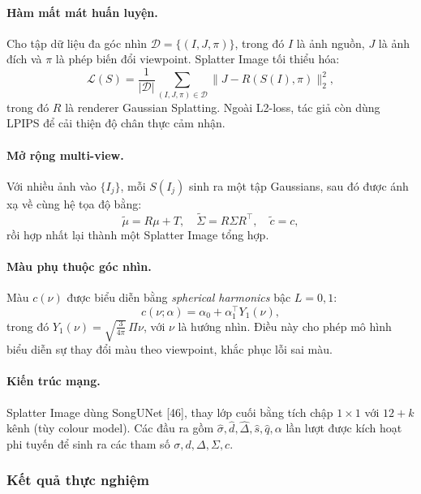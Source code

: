                 \paragraph{Hàm mất mát huấn luyện.}  
                Cho tập dữ liệu đa góc nhìn $\mathcal{D} = \{(I, J, \pi)\}$, trong đó $I$ là ảnh nguồn, $J$ là ảnh đích và $\pi$ là phép biến đổi viewpoint. Splatter Image tối thiểu hóa:
                \[
                \mathcal{L}(S) = \frac{1}{|\mathcal{D}|} \sum_{(I,J,\pi)\in \mathcal{D}} \|J - R(S(I),\pi)\|_2^2,
                \]
                trong đó $R$ là renderer Gaussian Splatting.  
                Ngoài L2-loss, tác giả còn dùng LPIPS để cải thiện độ chân thực cảm nhận.  
                
                \paragraph{Mở rộng multi-view.}  
                Với nhiều ảnh vào $\{I_j\}$, mỗi $S(I_j)$ sinh ra một tập Gaussians, sau đó được ánh xạ về cùng hệ tọa độ bằng:
                \[
                \tilde{\mu} = R\mu + T, \quad \tilde{\Sigma} = R \Sigma R^\top, \quad \tilde{c} = c,
                \]
                rồi hợp nhất lại thành một Splatter Image tổng hợp.
                
                \paragraph{Màu phụ thuộc góc nhìn.}  
                Màu $c(\nu)$ được biểu diễn bằng \textit{spherical harmonics} bậc $L=0,1$:
                \[
                c(\nu;\alpha) = \alpha_0 + \alpha_1^\top Y_1(\nu),
                \]
                trong đó $Y_1(\nu) = \sqrt{\tfrac{3}{4\pi}} \, \Pi\nu$, với $\nu$ là hướng nhìn. Điều này cho phép mô hình biểu diễn sự thay đổi màu theo viewpoint, khắc phục lỗi sai màu.
                
                \paragraph{Kiến trúc mạng.}  
                Splatter Image dùng SongUNet [46], thay lớp cuối bằng tích chập $1\times 1$ với $12+k$ kênh (tùy colour model). Các đầu ra gồm $\hat{\sigma}, \hat{d}, \hat{\Delta}, \hat{s}, \hat{q}, \alpha$ lần lượt được kích hoạt phi tuyến để sinh ra các tham số $\sigma, d, \Delta, \Sigma, c$.  
            
            \subsubsection{Kết quả thực nghiệm}

